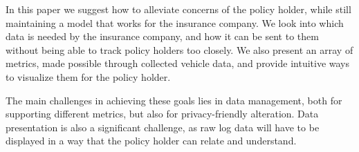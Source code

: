 In this paper we suggest how to alleviate concerns of the policy holder, while still maintaining a model that works for the insurance company. We look into which data is needed by the insurance company, and how it can be sent to them without being able to track policy holders too closely. We also present an array of metrics, made possible through collected vehicle data, and provide intuitive ways to visualize them for the policy holder.

The main challenges in achieving these goals lies in data management, both for supporting different metrics, but also for privacy-friendly alteration. Data presentation is also a significant challenge, as raw log data will have to be displayed in a way that the policy holder can relate and understand.

